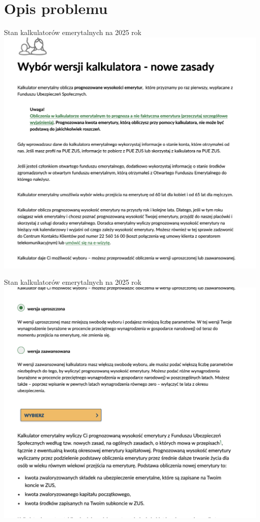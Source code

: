 \section{Opis problemu}

\begin{frame}[t]{Stan kalkulatorów emerytalnych na 2025 rok}
\includegraphics[width=.8\textwidth]{img/zus_calculator_01}
\end{frame}

\begin{frame}[t]{Stan kalkulatorów emerytalnych na 2025 rok}
\includegraphics[width=.8\textwidth]{img/zus_calculator_02}
\end{frame}

